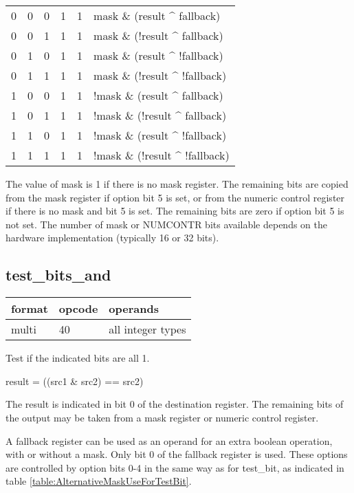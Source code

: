 \documentclass[forwardcom.tex]{subfiles}
\begin{document}
\begin{longtable} {|p{10mm}|p{10mm}|p{10mm}|p{10mm}|p{10mm}|p{60mm}|}
\hline
0 & 0 & 0 & 1 & 1 & mask \& (result \^{} fallback) \\
0 & 0 & 1 & 1 & 1 & mask \& (!result \^{} fallback) \\
0 & 1 & 0 & 1 & 1 & mask \& (result \^{} !fallback) \\
0 & 1 & 1 & 1 & 1 & mask \& (!result \^{} !fallback) \\
1 & 0 & 0 & 1 & 1 & !mask \& (result \^{} fallback) \\
1 & 0 & 1 & 1 & 1 & !mask \& (!result \^{} fallback) \\
1 & 1 & 0 & 1 & 1 & !mask \& (result \^{} !fallback) \\
1 & 1 & 1 & 1 & 1 & !mask \& (!result \^{} !fallback) \\
\hline
\end{longtable}
\vv

The value of mask is 1 if there is no mask register. 
The remaining bits are copied from the mask register if option bit 5 is set, or from the numeric control register if there is no mask and bit 5 is set. The remaining bits are zero if option bit 5 is not set. The number of mask or NUMCONTR bits available depends on the hardware implementation (typically 16 or 32 bits).
\vv


\subsection{test\_bits\_and}
\label{table:testBitsAndInstruction}
\begin{tabular}{|p{12mm}|p{15mm}|p{100mm}|}
\hline
\bfseries format & \bfseries opcode & \bfseries operands \\ \hline
multi & 40 & all integer types \\ \hline
\end{tabular}
\vv

Test if the indicated bits are all 1.

result = ((src1 \& src2) == src2)
\vv

The result is indicated in bit 0 of the destination register. 
The remaining bits of the output may be taken from a mask register or numeric control register. 
\vv

A fallback register can be used as an operand for an extra boolean operation, with or without a mask. Only bit 0 of the fallback register is used. These options are controlled by option bits 0-4 in the same way as for test\_bit, as indicated in table \ref{table:AlternativeMaskUseForTestBit}.
\vv
\end{document}
